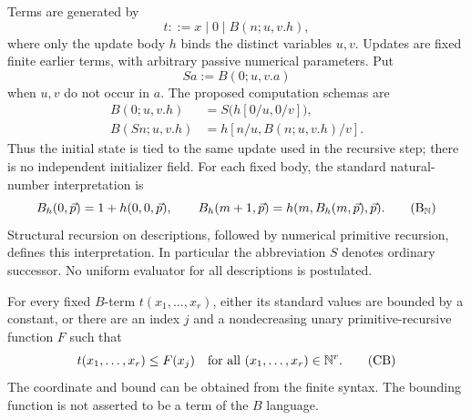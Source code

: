 Terms are generated by
\[
             t::=x\mid 0\mid B(n;u,v.h),
\]
where only the update body $h$ binds the distinct variables $u,v$.
Updates are fixed finite earlier terms, with arbitrary passive numerical
parameters. Put
\[
             Sa:=B(0;u,v.a)
\]
when $u,v$ do not occur in $a$. The proposed computation schemas are
\begin{align}
 B(0;u,v.h)&=S\bigl(h[0/u,0/v]\bigr),\label{obs:B0}\\
 B(Sn;u,v.h)&=h[n/u,B(n;u,v.h)/v].\label{obs:BS}
\end{align}
Thus the initial state is tied to the same update used in the recursive
step; there is no independent initializer field. For each fixed body,
the standard natural-number interpretation is
\[
 B_h(0,\vec p)=1+h(0,0,\vec p),\qquad
 B_h(m+1,\vec p)=h(m,B_h(m,\vec p),\vec p).
 \tag{B$_{\mathbb N}$}\label{obs:B-standard}
\]
Structural recursion on descriptions, followed by numerical primitive
recursion, defines this interpretation. In particular the abbreviation
$S$ denotes ordinary successor. No uniform evaluator for all descriptions
is postulated.

\begin{lemma}
\label{obs:coordinate-bound}
For every fixed $B$-term $t(x_1,\ldots,x_r)$, either its standard values
are bounded by a constant, or there are an index $j$ and a nondecreasing
unary primitive-recursive function $F$ such that
\[
        t(x_1,\ldots,x_r)\le F(x_j)
        \quad\hbox{for all }(x_1,\ldots,x_r)\in\mathbb N^r.
        \tag{CB}\label{obs:CB}
\]
The coordinate and bound can be obtained from the finite syntax. The
bounding function is not asserted to be a term of the $B$ language.
\end{lemma}

